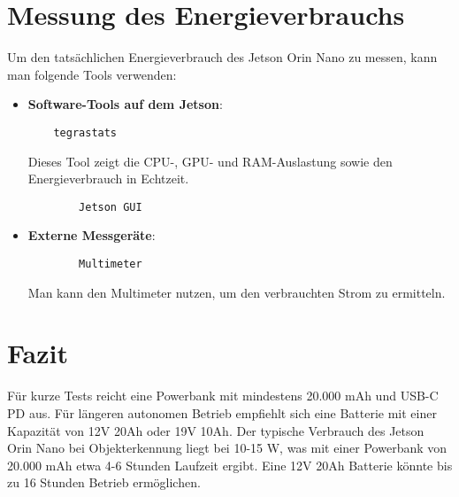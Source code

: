 \documentclass[12pt]{article}
\begin{document}
    


\clearpage

\section{Messung des Energieverbrauchs}
Um den tatsächlichen Energieverbrauch des Jetson Orin Nano zu messen, kann man folgende 
Tools verwenden:
\begin{itemize}
    \item \textbf{Software-Tools auf dem Jetson}:
    \begin{verbatim}
    tegrastats
    \end{verbatim}
    Dieses Tool zeigt die CPU-, GPU- und RAM-Auslastung sowie den Energieverbrauch in 
    Echtzeit.

    \begin{verbatim}
        Jetson GUI
    \end{verbatim}

    \item \textbf{Externe Messgeräte}: 
    \begin{verbatim}
        Multimeter
    \end{verbatim}
    Man kann den Multimeter nutzen, um den verbrauchten Strom zu ermitteln.
    
    \end{itemize}
\section{Fazit}
Für kurze Tests reicht eine Powerbank mit mindestens 20.000 mAh und USB-C PD aus. 
Für längeren autonomen Betrieb empfiehlt sich eine Batterie mit einer Kapazität 
von 12V 20Ah oder 19V 10Ah. Der typische Verbrauch des Jetson Orin Nano bei 
Objekterkennung liegt bei 10-15 W, was mit einer Powerbank von 20.000 mAh 
etwa 4-6 Stunden Laufzeit ergibt. Eine 12V 20Ah Batterie könnte bis zu 16 Stunden 
Betrieb ermöglichen.
\end{document}
